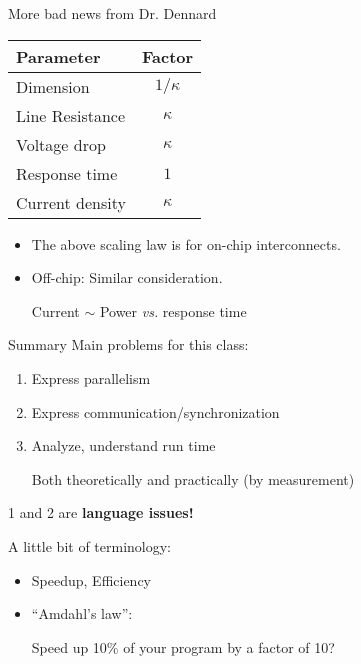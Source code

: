 \documentclass[english,compress]{beamer}
\begin{document}
\begin{frame}{More bad news from Dr. Dennard}
  \begin{center}
    \begin{tabular}{l|c}
      \textbf{Parameter} & \textbf{Factor} \\
      \hline
      Dimension & $1/\kappa$ \\
      Line Resistance & $\kappa$ \\
      Voltage drop & $\kappa$ \\
      Response time & $1$ \\
      Current density & $\kappa$
    \end{tabular}

  \end{center}
  \begin{itemize}
    \item The above scaling law is for on-chip interconnects.
    \item Off-chip: Similar consideration.

      Current $\sim $ Power \; \emph{vs.}\; response time
  \end{itemize}
\end{frame}
\begin{frame}{Summary}
  Main problems for this class:
  \begin{enumerate}
    \item Express parallelism
    \item Express communication/synchronization
    \item Analyze, understand run time

      Both theoretically and practically (by measurement)
  \end{enumerate}
  1 and 2 are \textbf{language issues!}

  \pause
  \bigskip
  A little bit of terminology:
  \begin{itemize}
    \item Speedup, Efficiency
    \item ``Amdahl's law'':

      Speed up 10\% of your program by a factor of 10?
  \end{itemize}
\end{frame}
\end{document}
